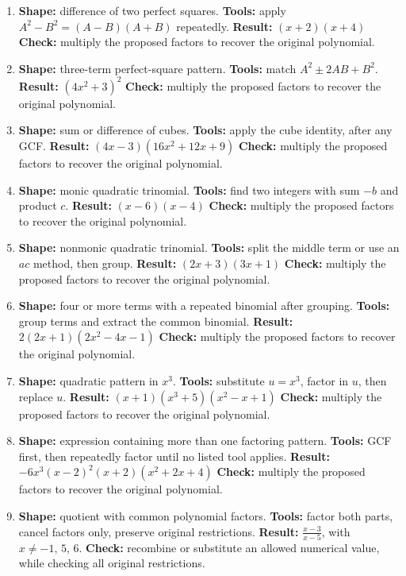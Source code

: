 \documentclass[11pt,oneside]{book}
\begin{document}
\begin{enumerate}[leftmargin=*,label=\textbf{CAP\arabic*.},itemsep=0.45\baselineskip]
\item \textbf{Shape:} difference of two perfect squares. \textbf{Tools:} apply $A^2-B^2=(A-B)(A+B)$ repeatedly. \textbf{Result:} $ \left(x + 2\right) \left(x + 4\right) $ \textbf{Check:} multiply the proposed factors to recover the original polynomial.
\item \textbf{Shape:} three-term perfect-square pattern. \textbf{Tools:} match $A^2\pm2AB+B^2$. \textbf{Result:} $ \left(4 x^{2} + 3\right)^{2} $ \textbf{Check:} multiply the proposed factors to recover the original polynomial.
\item \textbf{Shape:} sum or difference of cubes. \textbf{Tools:} apply the cube identity, after any GCF. \textbf{Result:} $ \left(4 x - 3\right) \left(16 x^{2} + 12 x + 9\right) $ \textbf{Check:} multiply the proposed factors to recover the original polynomial.
\item \textbf{Shape:} monic quadratic trinomial. \textbf{Tools:} find two integers with sum $-b$ and product $c$. \textbf{Result:} $ \left(x - 6\right) \left(x - 4\right) $ \textbf{Check:} multiply the proposed factors to recover the original polynomial.
\item \textbf{Shape:} nonmonic quadratic trinomial. \textbf{Tools:} split the middle term or use an $ac$ method, then group. \textbf{Result:} $ \left(2 x + 3\right) \left(3 x + 1\right) $ \textbf{Check:} multiply the proposed factors to recover the original polynomial.
\item \textbf{Shape:} four or more terms with a repeated binomial after grouping. \textbf{Tools:} group terms and extract the common binomial. \textbf{Result:} $ 2 \left(2 x + 1\right) \left(2 x^{2} - 4 x - 1\right) $ \textbf{Check:} multiply the proposed factors to recover the original polynomial.
\item \textbf{Shape:} quadratic pattern in $x^3$. \textbf{Tools:} substitute $u=x^3$, factor in $u$, then replace $u$. \textbf{Result:} $ \left(x + 1\right) \left(x^{3} + 5\right) \left(x^{2} - x + 1\right) $ \textbf{Check:} multiply the proposed factors to recover the original polynomial.
\item \textbf{Shape:} expression containing more than one factoring pattern. \textbf{Tools:} GCF first, then repeatedly factor until no listed tool applies. \textbf{Result:} $ - 6 x^{3} \left(x - 2\right)^{2} \left(x + 2\right) \left(x^{2} + 2 x + 4\right) $ \textbf{Check:} multiply the proposed factors to recover the original polynomial.
\item \textbf{Shape:} quotient with common polynomial factors. \textbf{Tools:} factor both parts, cancel factors only, preserve original restrictions. \textbf{Result:} $\displaystyle \frac{x - 3}{x - 5}$, with $x\ne -1,\,5,\,6$. \textbf{Check:} recombine or substitute an allowed numerical value, while checking all original restrictions.

\end{enumerate}
\end{document}

